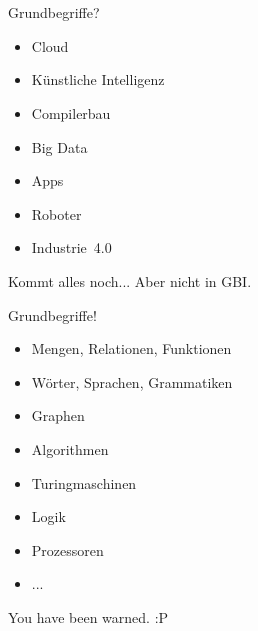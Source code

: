 

\newcommand{\handout}{}



\graphicspath{{../figures/}}



\section{}

\aboutMeFrame

\begin{frame}{Grundbegriffe?}
	\begin{itemize}
		\item Cloud
		\item Künstliche Intelligenz
		\item Compilerbau
		\item Big Data
		\item Apps
		\item Roboter
		\item Industrie~4.0
	\end{itemize}

	\pause
	Kommt alles noch... Aber nicht in GBI.
\end{frame}

\begin{frame}{Grundbegriffe!}
	\begin{itemize}
		\item Mengen, Relationen, Funktionen
		\item Wörter, Sprachen, Grammatiken
		\item Graphen
		\item Algorithmen
		\item Turingmaschinen
		\item Logik
		\item Prozessoren
		\item ...
	\end{itemize}
	\impl You have been warned. :P
\end{frame}

